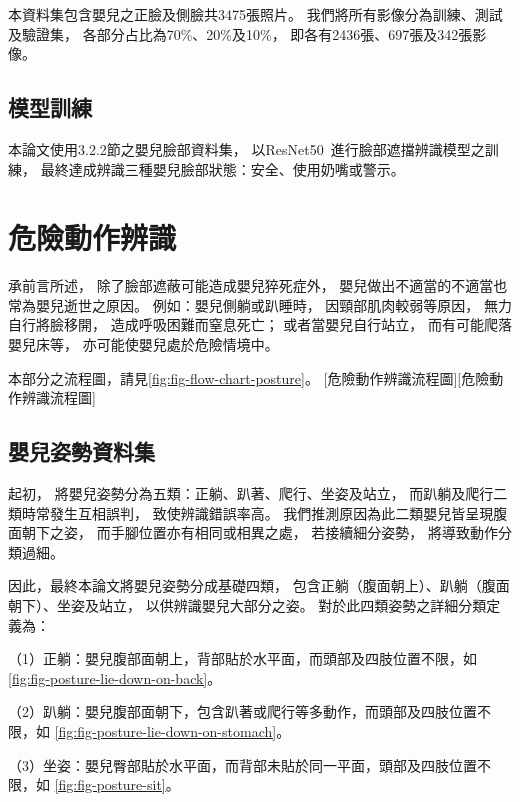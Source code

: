\documentclass[class=NCU_thesis, crop=false]{standalone}
\begin{document}
本資料集包含嬰兒之正臉及側臉共3475張照片。
我們將所有影像分為訓練、測試及驗證集，
各部分占比為70\%、20\%及10\%，
即各有2436張、697張及342張影像。

\subsection{模型訓練}
本論文使用3.2.2節之嬰兒臉部資料集，
以ResNet50~\cite{he_deep_2016}進行臉部遮擋辨識模型之訓練，
最終達成辨識三種嬰兒臉部狀態：安全、使用奶嘴或警示。

\section{危險動作辨識}
承前言所述，
除了臉部遮蔽可能造成嬰兒猝死症外，
嬰兒做出不適當的不適當也常為嬰兒逝世之原因。
例如：嬰兒側躺或趴睡時，
因頸部肌肉較弱等原因，
無力自行將臉移開，
造成呼吸困難而窒息死亡；
或者當嬰兒自行站立，
而有可能爬落嬰兒床等，
亦可能使嬰兒處於危險情境中。

本部分之流程圖，請見\cref{fig:fig-flow-chart-posture}。
[危險動作辨識流程圖][危險動作辨識流程圖]

\subsection{嬰兒姿勢資料集}

起初，
將嬰兒姿勢分為五類：正躺、趴著、爬行、坐姿及站立，
而趴躺及爬行二類時常發生互相誤判，
致使辨識錯誤率高。
我們推測原因為此二類嬰兒皆呈現腹面朝下之姿，
而手腳位置亦有相同或相異之處，
若接續細分姿勢，
將導致動作分類過細。

因此，最終本論文將嬰兒姿勢分成基礎四類，
包含正躺（腹面朝上）、趴躺（腹面朝下）、坐姿及站立，
以供辨識嬰兒大部分之姿。
對於此四類姿勢之詳細分類定義為：

（1）正躺：嬰兒腹部面朝上，背部貼於水平面，而頭部及四肢位置不限，如
\cref{fig:fig-posture-lie-down-on-back}。

（2）趴躺：嬰兒腹部面朝下，包含趴著或爬行等多動作，而頭部及四肢位置不限，如
\cref{fig:fig-posture-lie-down-on-stomach}。

（3）坐姿：嬰兒臀部貼於水平面，而背部未貼於同一平面，頭部及四肢位置不限，如
\cref{fig:fig-posture-sit}。
\end{document}

